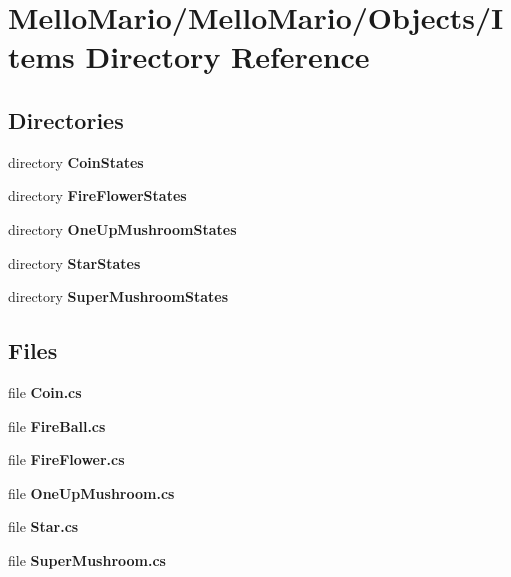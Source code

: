 \section{Mello\+Mario/\+Mello\+Mario/\+Objects/\+Items Directory Reference}
\label{dir_bfcc14112b6d4dea44a094063a351607}
\subsection*{Directories}
\begin{DoxyCompactItemize}
\item 
directory \textbf{ Coin\+States}
\item 
directory \textbf{ Fire\+Flower\+States}
\item 
directory \textbf{ One\+Up\+Mushroom\+States}
\item 
directory \textbf{ Star\+States}
\item 
directory \textbf{ Super\+Mushroom\+States}
\end{DoxyCompactItemize}
\subsection*{Files}
\begin{DoxyCompactItemize}
\item 
file \textbf{ Coin.\+cs}
\item 
file \textbf{ Fire\+Ball.\+cs}
\item 
file \textbf{ Fire\+Flower.\+cs}
\item 
file \textbf{ One\+Up\+Mushroom.\+cs}
\item 
file \textbf{ Star.\+cs}
\item 
file \textbf{ Super\+Mushroom.\+cs}
\end{DoxyCompactItemize}
